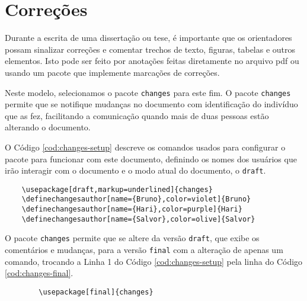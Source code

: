 \chapter{Correções}\label{cap:correcoes}

Durante a escrita de uma dissertação ou tese, é importante que os orientadores possam sinalizar correções e comentar trechos de texto, figuras, tabelas e outros elementos. Isto pode ser feito por anotações feitas diretamente no arquivo \gls{pdf} ou usando um pacote que implemente marcações de correções.

Neste modelo, selecionamos o pacote \texttt{changes} para este fim. O pacote \texttt{changes} permite que se notifique mudanças no documento com identificação do indivíduo que as fez, facilitando a comunicação quando mais de duas pessoas estão alterando o documento.

O Código \ref{cod:changes-setup} descreve os comandos usados para configurar o pacote para funcionar com este documento, definindo os nomes dos usuários que irão interagir com o documento e o modo atual do documento, o \texttt{draft}.

\begin{listing}[ht]
	\begin{verbatim}
	\usepackage[draft,markup=underlined]{changes}
	\definechangesauthor[name={Bruno},color=violet]{Bruno}
	\definechangesauthor[name={Hari},color=purple]{Hari}
	\definechangesauthor[name={Salvor},color=olive]{Salvor}
	\end{verbatim}
	\caption{Código \LaTeX{} usado para definir as informações referentes ao pacote \texttt{changes}.}
	\label{cod:changes-setup}
\end{listing}

O pacote \texttt{changes} permite que se altere da versão \texttt{draft}, que exibe os comentários e mudanças, para a versão \texttt{final} com a alteração de apenas um comando, trocando a Linha 1 do Código \ref{cod:changes-setup} pela linha do Código \ref{cod:changes-final}. 

\begin{listing}[ht]
	\begin{verbatim}
		\usepackage[final]{changes}
	\end{verbatim}
	\caption{Código \LaTeX{} usado para definir o formato do documento como \texttt{final} ao invés de \texttt{draft} com relação ao pacote \texttt{changes}.}
	\label{cod:changes-final}
\end{listing}

